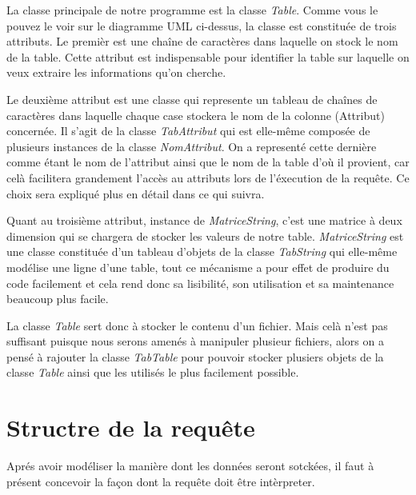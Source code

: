 \documentclass[oneside,13pt,a4paper]{report}
\begin{document}
La classe principale de notre programme est la classe \textit{Table}. 
Comme vous le pouvez le voir sur le diagramme UML ci-dessus, 
la classe est constituée de trois attributs. Le premièr est une chaîne de caractères dans laquelle on stock le nom de la table. 
Cette attribut est indispensable pour identifier la table sur laquelle on veux extraire les informations qu’on cherche.


Le deuxième attribut est une classe qui represente un tableau de chaînes de caractères dans laquelle chaque case stockera le nom de la colonne (Attribut) concernée. 
Il s'agit de la classe \textit{TabAttribut} qui est elle-même composée de plusieurs instances de la classe \textit{NomAttribut}.
On a representé cette dernière comme étant le nom de l'attribut ainsi que le nom de la table d'où il provient, 
car celà facilitera grandement l'accès au attributs lors de l'éxecution de la requête. Ce choix sera expliqué plus en détail dans ce qui suivra.

Quant au troisième attribut, instance de \textit{MatriceString}, c’est une matrice à deux dimension qui se chargera de stocker les valeurs de notre table.
\textit{MatriceString} est une classe constituée d'un tableau d'objets de la classe \textit{TabString} qui elle-même modélise une ligne d'une table, tout ce mécanisme a pour effet de produire du code facilement et cela rend donc sa lisibilité, son utilisation et sa maintenance beaucoup plus facile.

La classe \textit{Table} sert donc à stocker le contenu d'un fichier. Mais celà n'est pas suffisant puisque nous serons amenés à manipuler plusieur fichiers, alors on a pensé à rajouter 
la classe \textit{TabTable} pour pouvoir stocker plusiers objets de la classe \textit{Table} ainsi que les utilisés le plus facilement possible.

\section{Structre de la requête}

Aprés avoir modéliser la manière dont les données seront sotckées, il faut à présent concevoir la façon dont la requête doit être intèrpreter.
\end{document}
